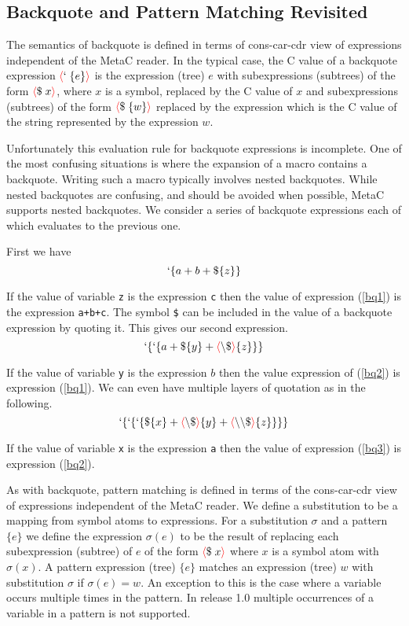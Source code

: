 \documentclass{article}
\newcommand{\fopen}{{\color{red} \langle}}
\newcommand{\fclose}{{\color{red} \rangle}}
\begin{document}
\subsection{Backquote and Pattern Matching Revisited}

The semantics of backquote is defined in terms of cons-car-cdr view of expressions independent of the MetaC reader.
In the typical case, the C value of a backquote expression
$\fopen ` \;\{e\}\fclose$ is the expression (tree) $e$ with subexpressions (subtrees) of the form $\fopen \$\;x \fclose$, where $x$ is a symbol,
replaced by the C value of $x$
and subexpressions (subtrees) of the form $\fopen \$\;\{w\}\fclose$ replaced by the expression which is the C value of the string represented by the expression $w$.

Unfortunately this evaluation rule for backquote expressions is incomplete.  One of the most
confusing situations is where the expansion of a macro contains a backquote.  Writing such a macro typically involves nested backquotes.  While nested backquotes
are confusing, and should be avoided when possible, MetaC supports nested backquotes.  We consider a series of backquote expressions each of which evaluates to the previous one.

First we have
\begin{equation}
\label{bq1}
`\{a+b+\$\{z\}\}
\end{equation}

If the value of variable {\tt z} is the expression {\tt c} then the value of expression (\ref{bq1}) is the expression {\tt a+b+c}.
The symbol {\tt \$} can be included in the value of a backquote expression by quoting it.  This gives our second expression.
\begin{equation}
\label{bq2}
`\{`\{a + \$\{y\} + \fopen \backslash\$\fclose\{z\}\}\}
\end{equation}

If the value of variable {\tt y} is the expression $b$ then the value expression of (\ref{bq2}) is expression (\ref{bq1}).
We can even have multiple layers of quotation as in the following.
\begin{equation}
\label{bq3}
`\{`\{`\{\$\{x\} + \fopen\backslash\$\fclose\{y\} + \fopen\backslash\backslash\$\fclose\{z\}\}\}\}
\end{equation}

If the value of variable {\tt x} is the expression {\tt a} then the value of expression (\ref{bq3}) is expression (\ref{bq2}).

As with backquote, pattern matching is defined in terms of the cons-car-cdr view of expressions independent of the MetaC reader.  We define a substitution to be a mapping from
symbol atoms to expressions. For a substitution $\sigma$ and a pattern $\{e\}$ we define the expression $\sigma(e)$
to be the result of replacing each subexpression (subtree) of $e$ of the form $\fopen \$\;x \fclose$ where $x$ is a symbol atom with $\sigma(x)$.  A pattern expression (tree) $\{e\}$ matches an expression (tree) $w$ with substitution $\sigma$
if $\sigma(e) = w$. An exception to this is the case where a variable occurs multiple times in the pattern.  In release 1.0 multiple occurrences of a variable in a pattern is not supported.
\end{document}
